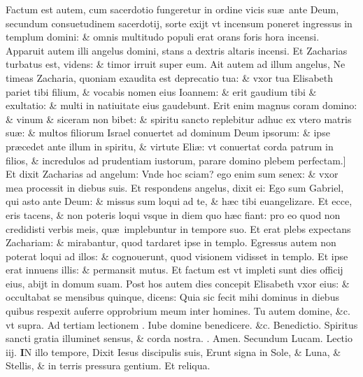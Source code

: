 \documentclass[a5paper,10pt]{book}
\makeatletter
\def\rightmarginnote{%
	\lrmarginnote{\hskip\columnwidth \hskip -1em}}
\DeclareRobustCommand{\Vbar}{\vers@resp{-0.1em}{V}}
\DeclareRobustCommand{\Rbar}{\vers@resp{0pt}{R}}
\newcommand{\vers@resp@sym}{\raisebox{0.2ex}{\rotatebox[origin=c]{-20}{$\m@th\rceil$}}}
\newcommand{\vers@resp}[2]{%
  {\ooalign{\hidewidth\kern#1\vers@resp@sym\hidewidth\cr#2\cr}}%
}%
\def\ae{æ}
\makeatother
\begin{document}
\begin{multicols*}{2}
Factum est autem, cum sacerdotio fungeretur in ordine vicis su\ae \ ante Deum, secundum consuetudinem sacerdotij, sorte exijt vt incensum poneret ingressus in templum domini: \& omnis multitudo populi erat orans foris hora incensi.
Apparuit autem illi angelus domini, stans a dextris altaris incensi.
Et Zacharias turbatus est, videns: \& timor irruit super eum.
Ait autem ad illum angelus, Ne timeas Zacharia, quoniam exaudita est deprecatio tua: \& vxor tua Elisabeth pariet tibi filium, \& vocabis nomen eius Ioannem: \& erit gaudium tibi \& exultatio: \& multi in natiuitate eius gaudebunt.
Erit enim magnus coram domino: \& vinum \& siceram non bibet: \& spiritu sancto replebitur adhuc ex vtero matris su\ae :
\& multos filiorum Israel conuertet ad dominum Deum ipsorum: \& ipse pr\ae cedet ante illum in spiritu, \& virtute Eli\ae : vt conuertat corda patrum in filios, \& incredulos ad prudentiam iustorum, parare domino plebem perfectam.]
Et\rightmarginnote{B} dixit Zacharias ad angelum: Vnde hoc sciam? ego enim sum senex: \& vxor mea processit in diebus suis.
Et respondens angelus, dixit ei: Ego sum Gabriel, qui asto ante Deum: \& missus sum loqui ad te, \& h\ae c tibi euangelizare.
Et ecce, eris tacens, \& non poteris loqui vsque in diem quo h\ae c fiant: pro eo quod non credidisti verbis meis, qu\ae \ implebuntur in tempore suo.
Et erat plebs expectans Zachariam: \& mirabantur, quod tardaret ipse in templo.
Egressus autem non poterat loqui ad illos: \& cognouerunt, quod visionem vidisset in templo.
Et ipse erat innuens illis: \& permansit mutus.
Et factum est vt impleti sunt dies officij eius, abijt in domum suam.
Post hos autem dies concepit Elisabeth vxor eius: \& occultabat se mensibus quinque, dicens: Quia sic fecit mihi dominus in diebus quibus respexit auferre opprobrium meum inter homines.
\newline Tu autem domine, \color{red} \&c. vt supra. \color{black}
\newline {} \color{red} Ad tertiam lectionem \Vbar . \color{black} Iube domine benedicere. \color{red} \&c. Benedictio. \color{black} Spiritus sancti gratia illuminet sensus, \& corda nostra. \color{red} \Rbar . \color{black} Amen.
\newline \color{red} Secundum Lucam. \hfill Lectio iij.\color{black}
\vspace{-1em}
\lettrine[lines=2]{\bfseries \color{red} I}{}N\rightmarginnote{Lu.\\21.} illo tempore, Dixit Iesus discipulis suis, Erunt signa in Sole, \& Luna, \& Stellis, \& in terris pressura gentium. \color{red} Et reliqua. \color{black}

\end{multicols*}
\end{document}

